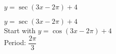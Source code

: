 {$y = \sec(3x - 2\pi) + 4$}
{$y = \sec(3x - 2\pi) + 4$\\
Start with $y = \cos (3x - 2\pi) + 4$\\
Period: $\dfrac{2\pi}{3}$

\begin{center}
\end{center}
}
